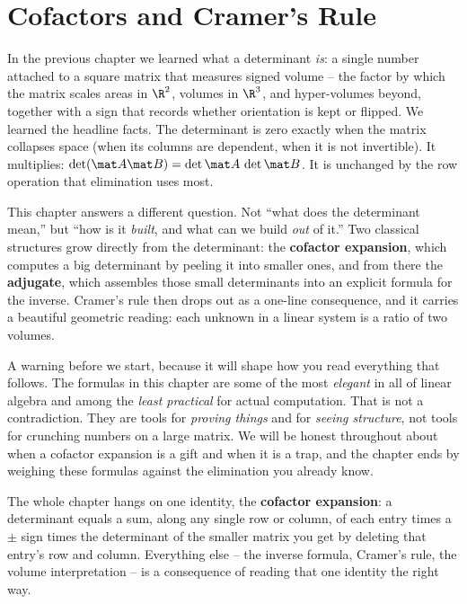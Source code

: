 \chapter{Cofactors and Cramer's Rule}

In the previous chapter we learned what a determinant \emph{is}: a single number attached to a square
matrix that measures signed volume -- the factor by which the matrix scales areas in $\R^2$, volumes
in $\R^3$, and hyper-volumes beyond, together with a sign that records whether orientation is kept or
flipped. We learned the headline facts. The determinant is zero exactly when the matrix collapses
space (when its columns are dependent, when it is not invertible). It multiplies: $\det(\mat A \mat
B)=\det\mat A\,\det\mat B$. It is unchanged by the row operation that elimination uses most.

This chapter answers a different question. Not ``what does the determinant mean,'' but ``how is it
\emph{built}, and what can we build \emph{out} of it.'' Two classical structures grow directly from
the determinant: the \textbf{cofactor expansion}, which computes a big determinant by peeling it into
smaller ones, and from there the \textbf{adjugate}, which assembles those small determinants into an
explicit formula for the inverse. Cramer's rule then drops out as a one-line consequence, and it
carries a beautiful geometric reading: each unknown in a linear system is a ratio of two volumes.

A warning before we start, because it will shape how you read everything that follows. The formulas
in this chapter are some of the most \emph{elegant} in all of linear algebra and among the
\emph{least practical} for actual computation. That is not a contradiction. They are tools for
\emph{proving things} and for \emph{seeing structure}, not tools for crunching numbers on a large
matrix. We will be honest throughout about when a cofactor expansion is a gift and when it is a trap,
and the chapter ends by weighing these formulas against the elimination you already know.

\begin{focusbox}
The whole chapter hangs on one identity, the \textbf{cofactor expansion}: a determinant equals a
sum, along any single row or column, of each entry times a $\pm$ sign times the determinant of the
smaller matrix you get by deleting that entry's row and column. Everything else -- the inverse
formula, Cramer's rule, the volume interpretation -- is a consequence of reading that one identity
the right way.
\end{focusbox}

